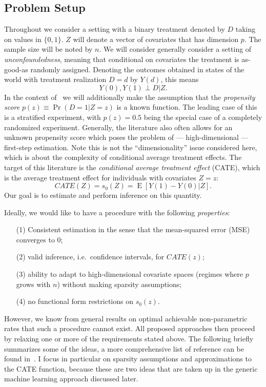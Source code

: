\documentclass[11pt, a4paper, leqno]{article}
\DeclareMathOperator{\E}{E}
\begin{document}
\subsection{Problem Setup}
Throughout we consider a setting with a binary treatment denoted by $D$ taking on values in $\{0, 1\}$.
$Z$ will denote a vector of covariates that has dimension $p$. The sample size will be noted by $n$.
We will consider generally consider a setting of \textit{unconfoundedness}, meaning that conditional on covariates the treatment is as-good-as randomly assigned.
Denoting the outcomes obtained in states of the world with treatment realization $D=d$ by $Y(d)$, this means
\begin{equation*}
    Y(0), Y(1) \perp D | Z.
\end{equation*}
In the context of~\cite{chernozhukov2023genml} we will additionally make the assumption that the \textit{propensity score} $p(z) \equiv \Pr(D=1|Z=z)$ is a known function.
The leading case of this is a stratified experiment, with $p(z) = 0.5$ being the special case of a completely randomized experiment.
Generally, the literature also often allows for an unknown propensity score which poses the problem of --- high-dimensional --- first-step estimation.
Note this is not the ``dimensionality'' issue considered here, which is about the complexity of conditional average treatment effects.
The target of this literature is the \textit{conditional average treatment effect} (CATE), which is the average treatment effect for individuals with covariates $Z=z$:
\begin{equation*}
    CATE(Z) = s_0(Z) = \E[Y(1) - Y(0)|Z].
\end{equation*}
Our goal is to estimate and perform inference on this quantity.

Ideally, we would like to have a procedure with the following \textit{properties}:
\begin{itemize}
    \item[(1)] Consistent estimation in the sense that the mean-squared error (MSE) converges to 0;
    \item[(2)] valid inference, i.e.\ confidence intervals, for $CATE(z)$;
    \item[(3)] ability to adapt to high-dimensional covariate spaces (regimes where $p$ grows with $n$) without making sparsity assumptions;
    \item[(4)] no functional form restrictions on $s_0(z)$.
\end{itemize}
However, we know from general results on optimal achievable non-parametric rates that such a procedure cannot exist.
All proposed approaches then proceed by relaxing one or more of the requirements stated above. The following briefly summarizes some of the ideas, a more comprehensive list of reference can be found in~\cite{causalml2024}.
I focus in particular on sparsity assumptions and approximations to the CATE function, because these are two ideas that are taken up in the generic machine learning approach discussed later.
\end{document}
